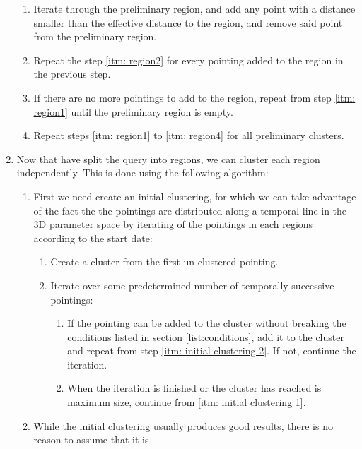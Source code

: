 \documentclass{report}
\begin{document}
\begin{enumerate}
\begin{enumerate}
        \item \label{itm: region2} Iterate through the preliminary region, and add any point with a distance smaller than the
        effective distance to the region, and remove said point from the preliminary region.
        \item Repeat the step \ref{itm: region2} for every pointing added to the region in the previous step.
        \item \label{itm: region4} If there are no more pointings to add to the region, repeat from step \ref{itm:
        region1} until the preliminary region is empty.
        \item Repeat steps \ref{itm: region1} to \ref{itm: region4} for all preliminary clusters.
    \end{enumerate}
    \item Now that have split the query into regions, we can cluster each region independently. This is done using the
    following algorithm:
    \begin{enumerate}
        \item First we need create an initial clustering, for which we can take advantage of the fact the the pointings
        are distributed along a temporal line in the 3D parameter space by iterating of the pointings in each regions
        according to the start date:
        \begin{enumerate}
            \item \label{itm: initial clustering 1}Create a cluster from the first un-clustered pointing.
            \item \label{itm: initial clustering 2} Iterate over some predetermined number of temporally successive
            pointings:
            \begin{enumerate}
                \item If the pointing can be added to the cluster without breaking the conditions listed in section
                \ref{list:conditions}, add it to the cluster and repeat from step \ref{itm: initial clustering 2}. If
                not, continue the iteration.
                \item When the iteration is finished or the cluster has reached is maximum size, continue from
                \ref{itm: initial clustering 1}.
            \end{enumerate}
        \end{enumerate}
        \item \label{itm: improvement1} While the initial clustering usually produces good results, there is no reason to assume that it is

\end{enumerate}
\end{enumerate}
\end{document}
